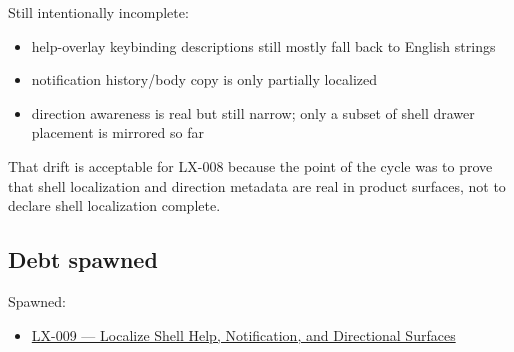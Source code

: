 Still intentionally incomplete:

\begin{itemize}
\tightlist
\item
  help-overlay keybinding descriptions still mostly fall back to English strings
\item
  notification history/body copy is only partially localized
\item
  direction awareness is real but still narrow; only a subset of shell drawer placement is mirrored so far
\end{itemize}

That drift is acceptable for LX-008 because the point of the cycle was to prove that shell localization and direction metadata are real in product surfaces, not to declare shell localization complete.

\subsection{Debt spawned}\label{record-194-debt-spawned}

Spawned:

\begin{itemize}
\tightlist
\item
  \href{https://github.com/flyingrobots/bijou/blob/cbd70612140e7a450d764b3c7be1c6af878b99bc/docs/method/graveyard/legacy-backlog/LX-009-localize-shell-help-notification-and-directional-surfaces.md}{LX-009 --- Localize Shell Help, Notification, and Directional Surfaces}
\end{itemize}

